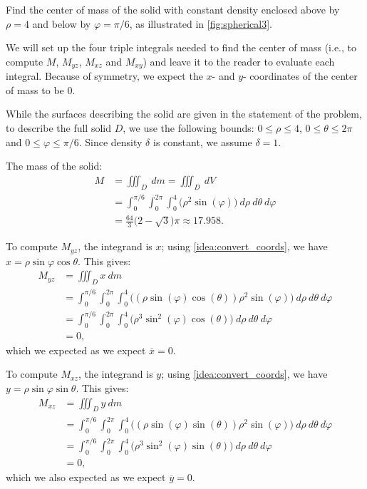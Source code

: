{Find the center of mass of the solid with constant density enclosed above by $\rho=4$ and below by $\varphi = \pi/6$, as illustrated in \autoref{fig:spherical3}.}
{We will set up the four triple integrals needed to find the center of mass (i.e., to compute $M$, $M_{yz}$, $M_{xz}$ and $M_{xy}$) and leave it to the reader to evaluate each integral. Because of symmetry, we expect the $x$- and $y$- coordinates of the center of mass to be 0.

While the surfaces describing the solid are given in the statement of the problem, to describe the full solid $D$, we use the following bounds: $0 \leq \rho \leq 4$, $0 \leq \theta \leq 2\pi$ and $0 \leq \varphi \leq \pi/6$. Since density $\delta$ is constant, we assume $\delta =1$.

The mass of the solid:
\begin{align*}
M &= \iiint_D\ dm = \iiint_D\ dV\\
	&= \int_0^{\pi/6}\int_0^{2\pi}\int_0^4\big(\rho^2\sin(\varphi)\big)\ d\rho\ d\theta\ d\varphi\\
	&= \frac{64}3\big(2-\sqrt{3}\big)\pi \approx 17.958.
\end{align*}

To compute $M_{yz}$, the integrand is $x$; using \autoref{idea:convert_coords}, we have $x = \rho\sin\varphi\cos\theta$. This gives:
\begin{align*}
M_{yz} &= \iiint_D x\ dm \\
	&= \int_0^{\pi/6}\int_0^{2\pi}\int_0^4 \big((\rho\sin(\varphi)\cos(\theta))\rho^2\sin(\varphi)\big) \ d\rho\ d\theta\ d\varphi\\
	&= \int_0^{\pi/6}\int_0^{2\pi}\int_0^4 \big(\rho^3\sin^2(\varphi)\cos(\theta)\big) \ d\rho\ d\theta\ d\varphi\\
	&=0,
\end{align*}
which we expected as we expect $\overline{x} = 0$.

To compute $M_{xz}$, the integrand is $y$; using \autoref{idea:convert_coords}, we have $y = \rho\sin\varphi\sin\theta$. This gives:
\begin{align*}
M_{xz} &= \iiint_D y\ dm \\
	&= \int_0^{\pi/6}\int_0^{2\pi}\int_0^4 \big((\rho\sin(\varphi)\sin(\theta))\rho^2\sin(\varphi)\big) \ d\rho\ d\theta\ d\varphi\\
	&= \int_0^{\pi/6}\int_0^{2\pi}\int_0^4 \big(\rho^3\sin^2(\varphi)\sin(\theta)\big) \ d\rho\ d\theta\ d\varphi\\
	&=0,
\end{align*}
which we also expected as we expect $\overline{y} = 0$.

}
